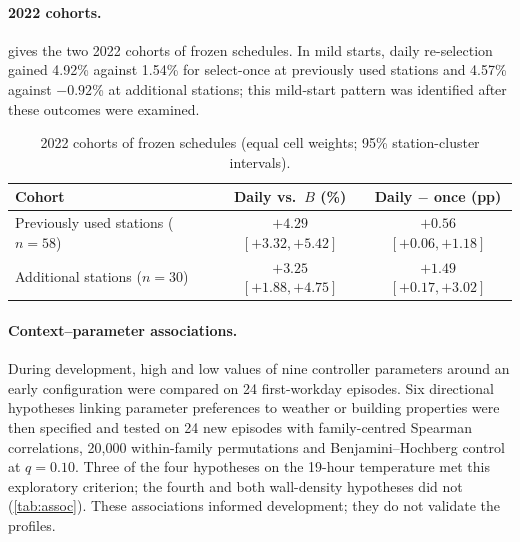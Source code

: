 \paragraph{2022 cohorts.}
 gives the two 2022 cohorts of frozen schedules. In mild starts, daily re-selection gained 4.92\% against
1.54\% for select-once at previously used stations and 4.57\% against $-0.92$\% at additional stations; this mild-start
pattern was identified after these outcomes were examined.

\begin{table}[!htbp]
\centering
\caption{2022 cohorts of frozen schedules (equal cell weights; 95\% station-cluster intervals).}
\label{tab:2022}
\small
\begin{tabular}{lcc}
\toprule
Cohort & Daily vs.\ $B$ (\%) & Daily $-$ once (pp)\\
\midrule
Previously used stations ($n = 58$) & $+4.29$ $[+3.32, +5.42]$ & $+0.56$ $[+0.06, +1.18]$\\
Additional stations ($n = 30$)      & $+3.25$ $[+1.88, +4.75]$ & $+1.49$ $[+0.17, +3.02]$\\
\bottomrule
\end{tabular}
\end{table}

\paragraph{Context--parameter associations.}
During development, high and low values of nine controller parameters around an early configuration were compared on
24 first-workday episodes. Six directional hypotheses linking parameter preferences to weather or building properties
were then specified and tested on 24 new episodes with family-centred Spearman correlations, 20,000 within-family
permutations and Benjamini--Hochberg control~\cite{benjamini1995fdr} at $q=0.10$. Three of the four hypotheses on the
19-hour temperature met this exploratory criterion; the fourth and both wall-density hypotheses did not (\cref{tab:assoc}).
These associations informed development; they do not validate the profiles.

